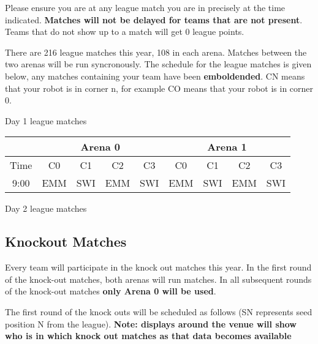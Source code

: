 \documentclass[12pt]{article}
\begin{document}
Please ensure you are at any league match you are in precisely at the time
indicated. \textbf{Matches will not be delayed for teams that are not present}.
Teams that do not show up to a match will get 0 league points.


There are 216 league matches this year, 108 in each arena. Matches
between the two arenas will be run syncronously. The schedule for the
league matches is given below, any matches containing your team have
been \textbf{emboldended}. CN means that your robot is in corner n, for example
CO means that your robot is in corner 0.



\begin{center}
    Day 1 league matches
    \begin{tabular}{|c|l|l|l|l|l|l|l|l|}
        \hline
        \multicolumn{1}{|c|}{} & \multicolumn{4}{|c|}{Arena 0} & \multicolumn{4}{|c|}{Arena 1} \\ \hline
        Time &
 \multicolumn{1}{|c|}{C0}  &
 \multicolumn{1}{|c|}{C1}  &
 \multicolumn{1}{|c|}{C2}  &
 \multicolumn{1}{|c|}{C3}  &
 \multicolumn{1}{|c|}{C0}  &
 \multicolumn{1}{|c|}{C1}  &
 \multicolumn{1}{|c|}{C2}  &
 \multicolumn{1}{|c|}{C3} \\ \hhline{|=|=|=|=|=|=|=|=|=|}
        9:00 & EMM & SWI & EMM & SWI & EMM & SWI & EMM & SWI \\ \hline
    \end{tabular}
\end{center}

Day 2 league matches

\subsection{Knockout Matches}

Every team will participate in the knock out matches this year. In the first
round of the knock-out matches, both arenas will run matches. In all subsequent
rounds of the knock-out matches \textbf{only Arena 0 will be used}.

The first round of the knock outs will be scheduled as follows (SN represents
seed position N from the league). \textbf{Note: displays around the venue will
show who is in which knock out matches as that data becomes available}
\end{document}
